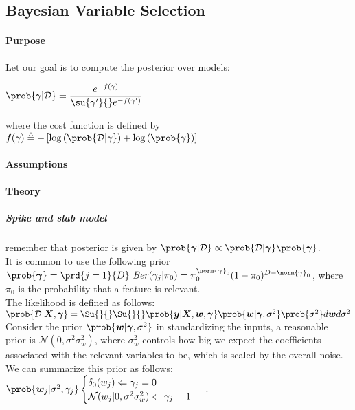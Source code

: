 \subsection{Bayesian Variable Selection}
\paragraph{Purpose}
Let  our goal is to compute the posterior over models:
\begin{center}
    $\prob{\gamma|\mathcal{D}} = \dfrac{e^{-f(\gamma)}}{\su{\gamma'}{}e^{-f(\gamma')}}$
\end{center}
where the cost function is defined by $f(\gamma) \triangleq -\left[\log\left(\prob{
\mathcal{D}|\gamma}\right) + \log\left(\prob{\gamma}\right)\right]$

\paragraph{Assumptions}
\paragraph{Theory}
\subparagraph{Spike and slab model}
remember that posterior is given by $\prob{\bm{\gamma}|\mathcal{D}}\propto \prob{
\mathcal{D}|\bm{\gamma}}\prob{\bm{\gamma}}$.\\
It is common to use the following prior $\prob{\bm{\gamma}} = \prd{j=1}{D}\text{
\emph{Ber}}(\gamma_{j}|\pi_{0}) = \pi_{0}^{\norm{\gamma}_{0}}(1-\pi_{0})^{D-\norm{
\gamma}_{0}}$, where $\pi_{0}$ is the probability that a feature is relevant.\\
The likelihood is defined as follows: $\prob{\mathcal{D}|\bm{X},\bm{\gamma}} = 
\Su{}{}\Su{}{}\prob{\bm{y}|\bm{X},\bm{w},\bm{\gamma}}\prob{\bm{w}|\bm{\gamma},
\sigma^{2}}\prob{\sigma^{2}}d\bm{w}d\sigma^{2}$\\
Consider the prior $\prob{\bm{w}|\bm{\gamma},\sigma^{2}}$ in standardizing the inputs, 
a reasonable prior is $\mathcal{N}(0, \sigma^{2}\sigma_{w}^{2})$, where 
$\sigma_{w}^{2}$ controls how big we expect the coefficients associated with the 
relevant variables to be, which is scaled by the overall noise. We can summarize this 
prior as follows: $\prob{\bm{w}_{j}|\sigma^{2},\gamma_{j}}
\begin{cases}
    \delta_{0}(w_{j}) \Leftarrow \gamma_{j} = 0\\
    \mathcal{N}(w_{j}|0, \sigma^{2}\sigma_{w}^{2}) \Leftarrow \gamma_{j} = 1
\end{cases}$
.

